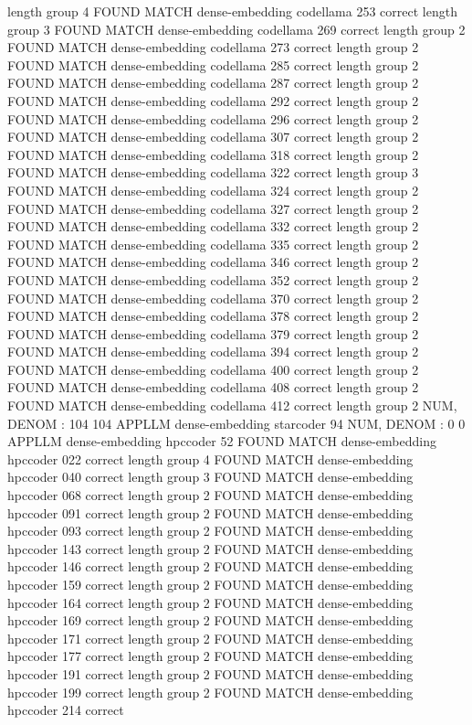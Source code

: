 length group  4
FOUND MATCH dense-embedding codellama 253 correct
length group  3
FOUND MATCH dense-embedding codellama 269 correct
length group  2
FOUND MATCH dense-embedding codellama 273 correct
length group  2
FOUND MATCH dense-embedding codellama 285 correct
length group  2
FOUND MATCH dense-embedding codellama 287 correct
length group  2
FOUND MATCH dense-embedding codellama 292 correct
length group  2
FOUND MATCH dense-embedding codellama 296 correct
length group  2
FOUND MATCH dense-embedding codellama 307 correct
length group  2
FOUND MATCH dense-embedding codellama 318 correct
length group  2
FOUND MATCH dense-embedding codellama 322 correct
length group  3
FOUND MATCH dense-embedding codellama 324 correct
length group  2
FOUND MATCH dense-embedding codellama 327 correct
length group  2
FOUND MATCH dense-embedding codellama 332 correct
length group  2
FOUND MATCH dense-embedding codellama 335 correct
length group  2
FOUND MATCH dense-embedding codellama 346 correct
length group  2
FOUND MATCH dense-embedding codellama 352 correct
length group  2
FOUND MATCH dense-embedding codellama 370 correct
length group  2
FOUND MATCH dense-embedding codellama 378 correct
length group  2
FOUND MATCH dense-embedding codellama 379 correct
length group  2
FOUND MATCH dense-embedding codellama 394 correct
length group  2
FOUND MATCH dense-embedding codellama 400 correct
length group  2
FOUND MATCH dense-embedding codellama 408 correct
length group  2
FOUND MATCH dense-embedding codellama 412 correct
length group  2
NUM, DENOM : 104 104
APPLLM dense-embedding starcoder
94
NUM, DENOM : 0 0
APPLLM dense-embedding hpccoder
52
FOUND MATCH dense-embedding hpccoder 022 correct
length group  4
FOUND MATCH dense-embedding hpccoder 040 correct
length group  3
FOUND MATCH dense-embedding hpccoder 068 correct
length group  2
FOUND MATCH dense-embedding hpccoder 091 correct
length group  2
FOUND MATCH dense-embedding hpccoder 093 correct
length group  2
FOUND MATCH dense-embedding hpccoder 143 correct
length group  2
FOUND MATCH dense-embedding hpccoder 146 correct
length group  2
FOUND MATCH dense-embedding hpccoder 159 correct
length group  2
FOUND MATCH dense-embedding hpccoder 164 correct
length group  2
FOUND MATCH dense-embedding hpccoder 169 correct
length group  2
FOUND MATCH dense-embedding hpccoder 171 correct
length group  2
FOUND MATCH dense-embedding hpccoder 177 correct
length group  2
FOUND MATCH dense-embedding hpccoder 191 correct
length group  2
FOUND MATCH dense-embedding hpccoder 199 correct
length group  2
FOUND MATCH dense-embedding hpccoder 214 correct
